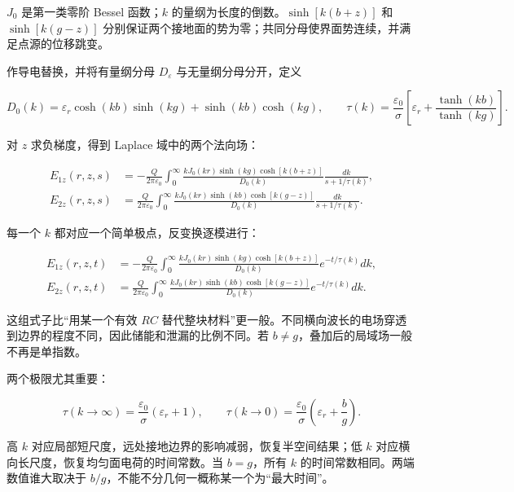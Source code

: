 \documentclass[
  11pt,
  a4paper,
  oneside,
  openany]{report}
\numberwithin{equation}{chapter}
\begin{document}
\(J_0\) 是第一类零阶 Bessel 函数；\(k\)
的量纲为长度的倒数。\(\sinh[k(b+z)]\) 和 \(\sinh[k(g-z)]\)
分别保证两个接地面的势为零；共同分母使界面势连续，并满足点源的位移跳变。

作导电替换，并将有量纲分母 \(D_\varepsilon\) 与无量纲分母分开，定义

\begin{equation}
D_0(k)=\varepsilon_r\cosh(kb)\sinh(kg)+\sinh(kb)\cosh(kg),
\qquad
\tau(k)=\frac{\varepsilon_0}{\sigma}
\left[\varepsilon_r+\frac{\tanh(kb)}{\tanh(kg)}\right].
\end{equation}

对 \(z\) 求负梯度，得到 Laplace 域中的两个法向场：

\begin{equation}
\begin{aligned}
E_{1z}(r,z,s)&=-\frac{Q}{2\pi\varepsilon_0}
\int_0^\infty\frac{kJ_0(kr)\sinh(kg)\cosh[k(b+z)]}{D_0(k)}
\frac{dk}{s+1/\tau(k)},\\
E_{2z}(r,z,s)&=\frac{Q}{2\pi\varepsilon_0}
\int_0^\infty\frac{kJ_0(kr)\sinh(kb)\cosh[k(g-z)]}{D_0(k)}
\frac{dk}{s+1/\tau(k)}.
\end{aligned}
\end{equation}

每一个 \(k\) 都对应一个简单极点，反变换逐模进行：

\begin{equation}
\begin{aligned}
E_{1z}(r,z,t)&=-\frac{Q}{2\pi\varepsilon_0}
\int_0^\infty\frac{kJ_0(kr)\sinh(kg)\cosh[k(b+z)]}{D_0(k)}
e^{-t/\tau(k)}dk,\\
E_{2z}(r,z,t)&=\frac{Q}{2\pi\varepsilon_0}
\int_0^\infty\frac{kJ_0(kr)\sinh(kb)\cosh[k(g-z)]}{D_0(k)}
e^{-t/\tau(k)}dk.
\end{aligned}
\end{equation}

这组式子比``用某一个有效 \(RC\)
替代整块材料''更一般。不同横向波长的电场穿透到边界的程度不同，因此储能和泄漏的比例不同。若
\(b\ne g\)，叠加后的局域场一般不再是单指数。

两个极限尤其重要：

\begin{equation}
\tau(k\to\infty)=\frac{\varepsilon_0}{\sigma}(\varepsilon_r+1),
\qquad
\tau(k\to0)=\frac{\varepsilon_0}{\sigma}\left(\varepsilon_r+\frac bg\right).
\end{equation}

高 \(k\) 对应局部短尺度，远处接地边界的影响减弱，恢复半空间结果；低
\(k\) 对应横向长尺度，恢复均匀面电荷的时间常数。当 \(b=g\)，所有 \(k\)
的时间常数相同。两端数值谁大取决于
\(b/g\)，不能不分几何一概称某一个为``最大时间''。
\end{document}
